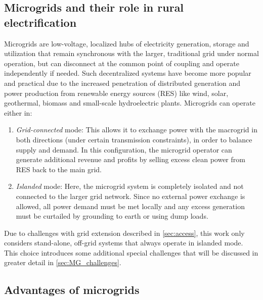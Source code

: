 \documentclass[final,3p,times]{elsarticle}
\begin{document}
\subsection{Microgrids and their role in rural electrification}

Microgrids are low-voltage, localized hubs of electricity generation, storage and utilization that remain synchronous with the larger, traditional grid under normal operation, but can disconnect at the common point of coupling and operate independently if needed. Such decentralized systems have become more popular and practical due to the increased penetration of distributed generation and power production from renewable energy sources (RES) like wind, solar, geothermal, biomass and small-scale hydroelectric plants. Microgrids can operate either in:
\begin{enumerate}
    \item \textit{Grid-connected} mode: This allows it to exchange power with the macrogrid in both directions (under certain transmission constraints), in order to balance supply and demand. In this configuration, the microgrid operator can generate additional revenue and profits by selling excess clean power from RES back to the main grid.
    
    \item \textit{Islanded} mode: Here, the microgrid system is completely isolated and not connected to the larger grid network. Since no external power exchange is allowed, all power demand must be met locally and any excess generation must be curtailed by grounding to earth or using dump loads.
\end{enumerate}

Due to challenges with grid extension described in \cref{sec:access}, this work only considers stand-alone, off-grid systems that always operate in islanded mode. This choice introduces some additional special challenges that will be discussed in greater detail in \cref{sec:MG_challenges}. 

\subsection{Advantages of microgrids}
\end{document}
